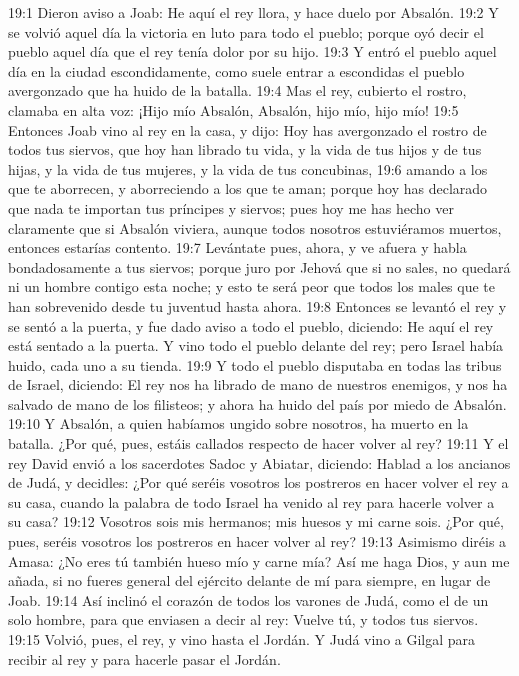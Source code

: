 19:1 Dieron aviso a Joab: He aquí el rey llora, y hace duelo por Absalón.  
19:2 Y se volvió aquel día la victoria en luto para todo el pueblo; porque oyó decir el pueblo aquel día que el rey tenía dolor por su hijo.  
19:3 Y entró el pueblo aquel día en la ciudad escondidamente, como suele entrar a escondidas el pueblo avergonzado que ha huido de la batalla.  
19:4 Mas el rey, cubierto el rostro, clamaba en alta voz: ¡Hijo mío Absalón, Absalón, hijo mío, hijo mío!  
19:5 Entonces Joab vino al rey en la casa, y dijo: Hoy has avergonzado el rostro de todos tus siervos, que hoy han librado tu vida, y la vida de tus hijos y de tus hijas, y la vida de tus mujeres, y la vida de tus concubinas,  
19:6 amando a los que te aborrecen, y aborreciendo a los que te aman; porque hoy has declarado que nada te importan tus príncipes y siervos; pues hoy me has hecho ver claramente que si Absalón viviera, aunque todos nosotros estuviéramos muertos, entonces estarías contento.  
19:7 Levántate pues, ahora, y ve afuera y habla bondadosamente a tus siervos; porque juro por Jehová que si no sales, no quedará ni un hombre contigo esta noche; y esto te será peor que todos los males que te han sobrevenido desde tu juventud hasta ahora.  
19:8 Entonces se levantó el rey y se sentó a la puerta, y fue dado aviso a todo el pueblo, diciendo: He aquí el rey está sentado a la puerta. Y vino todo el pueblo delante del rey; pero Israel había huido, cada uno a su tienda.  
19:9 Y todo el pueblo disputaba en todas las tribus de Israel, diciendo: El rey nos ha librado de mano de nuestros enemigos, y nos ha salvado de mano de los filisteos; y ahora ha huido del país por miedo de Absalón.  
19:10 Y Absalón, a quien habíamos ungido sobre nosotros, ha muerto en la batalla. ¿Por qué, pues, estáis callados respecto de hacer volver al rey? 
19:11 Y el rey David envió a los sacerdotes Sadoc y Abiatar, diciendo: Hablad a los ancianos de Judá, y decidles: ¿Por qué seréis vosotros los postreros en hacer volver el rey a su casa, cuando la palabra de todo Israel ha venido al rey para hacerle volver a su casa?  
19:12 Vosotros sois mis hermanos; mis huesos y mi carne sois. ¿Por qué, pues, seréis vosotros los postreros en hacer volver al rey?  
19:13 Asimismo diréis a Amasa: ¿No eres tú también hueso mío y carne mía? Así me haga Dios, y aun me añada, si no fueres general del ejército delante de mí para siempre, en lugar de Joab.  
19:14 Así inclinó el corazón de todos los varones de Judá, como el de un solo hombre, para que enviasen a decir al rey: Vuelve tú, y todos tus siervos.  
19:15 Volvió, pues, el rey, y vino hasta el Jordán. Y Judá vino a Gilgal para recibir al rey y para hacerle pasar el Jordán.  
